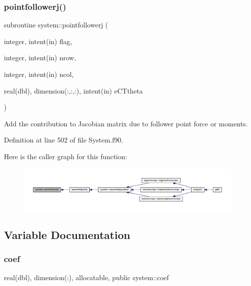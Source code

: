 \subsubsection{\texorpdfstring{pointfollowerj()}{pointfollowerj()}}
{\footnotesize\ttfamily subroutine system\+::pointfollowerj (\begin{DoxyParamCaption}\item[{integer, intent(in)}]{flag,  }\item[{integer, intent(in)}]{nrow,  }\item[{integer, intent(in)}]{ncol,  }\item[{real(dbl), dimension(\+:,\+:,\+:), intent(in)}]{e\+C\+Ttheta }\end{DoxyParamCaption})\hspace{0.3cm}{\ttfamily [private]}}



Add the contribution to Jacobian matrix due to follower point force or moments. 



Definition at line 502 of file System.\+f90.

Here is the caller graph for this function\+:\nopagebreak
\begin{figure}[H]
\begin{center}
\leavevmode
\includegraphics[width=350pt]{namespacesystem_a048a8c1a606cebab7e33f3ae1877c31a_icgraph}
\end{center}
\end{figure}


\subsection{Variable Documentation}
\mbox{\label{namespacesystem_ac5c6f08d5a21faff727c9a1240bae697}} 
\subsubsection{\texorpdfstring{coef}{coef}}
{\footnotesize\ttfamily real(dbl), dimension(\+:), allocatable, public system\+::coef}



